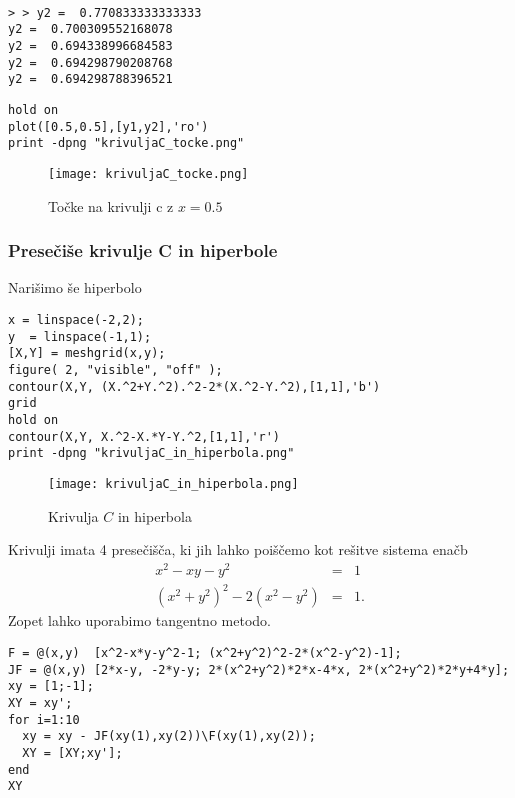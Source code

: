 \documentclass[11pt]{article}
\begin{document}
\begin{verbatim}

> > y2 =  0.770833333333333
y2 =  0.700309552168078
y2 =  0.694338996684583
y2 =  0.694298790208768
y2 =  0.694298788396521
\end{verbatim}
\begin{verbatim}
hold on
plot([0.5,0.5],[y1,y2],'ro')
print -dpng "krivuljaC_tocke.png"
\end{verbatim}
\begin{figure}[htb]
\centering
\texttt{[image: krivuljaC\_tocke.png]}
\caption{Točke na krivulji c z \(x=0.5\)}
\end{figure}

\subsubsection{Presečiše krivulje C in hiperbole}
\label{sec:orgheadline1}
Narišimo še hiperbolo
\begin{verbatim}
x = linspace(-2,2);
y  = linspace(-1,1);
[X,Y] = meshgrid(x,y);
figure( 2, "visible", "off" );
contour(X,Y, (X.^2+Y.^2).^2-2*(X.^2-Y.^2),[1,1],'b')
grid
hold on
contour(X,Y, X.^2-X.*Y-Y.^2,[1,1],'r')
print -dpng "krivuljaC_in_hiperbola.png"
\end{verbatim}
\begin{figure}[htb]
\centering
\texttt{[image: krivuljaC\_in\_hiperbola.png]}
\caption{Krivulja \(C\) in hiperbola}
\end{figure}
Krivulji imata 4 presečišča, ki jih lahko poiščemo kot rešitve sistema enačb
\begin{eqnarray*}
x^2-xy-y^2&=&1\\ 
(x^2+y^2)^2-2(x^2-y^2)&=&1.
\end{eqnarray*}
Zopet lahko uporabimo tangentno metodo.
\begin{verbatim}
F = @(x,y)  [x^2-x*y-y^2-1; (x^2+y^2)^2-2*(x^2-y^2)-1];
JF = @(x,y) [2*x-y, -2*y-y; 2*(x^2+y^2)*2*x-4*x, 2*(x^2+y^2)*2*y+4*y];
xy = [1;-1];
XY = xy';
for i=1:10
  xy = xy - JF(xy(1),xy(2))\F(xy(1),xy(2));
  XY = [XY;xy'];
end
XY
\end{verbatim}
\end{document}
